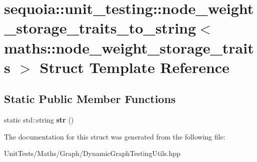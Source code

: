 \hypertarget{structsequoia_1_1unit__testing_1_1node__weight__storage__traits__to__string_3_01maths_1_1node__weight__storage__traits_01_4}{}\section{sequoia\+::unit\+\_\+testing\+::node\+\_\+weight\+\_\+storage\+\_\+traits\+\_\+to\+\_\+string$<$ maths\+::node\+\_\+weight\+\_\+storage\+\_\+traits $>$ Struct Template Reference}
\label{structsequoia_1_1unit__testing_1_1node__weight__storage__traits__to__string_3_01maths_1_1node__weight__storage__traits_01_4}
\subsection*{Static Public Member Functions}
\begin{DoxyCompactItemize}
\item 
\mbox{\label{structsequoia_1_1unit__testing_1_1node__weight__storage__traits__to__string_3_01maths_1_1node__weight__storage__traits_01_4_a52c118f201bd6e05753362e98799e1de}} 
static std\+::string {\bfseries str} ()
\end{DoxyCompactItemize}


The documentation for this struct was generated from the following file\+:\begin{DoxyCompactItemize}
\item 
Unit\+Tests/\+Maths/\+Graph/Dynamic\+Graph\+Testing\+Utils.\+hpp\end{DoxyCompactItemize}
